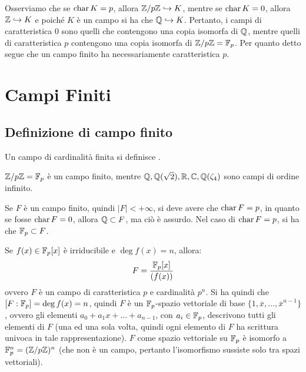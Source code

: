 \documentclass[11pt]{scrartcl}
\begin{document}
\begin{remark}
Osserviamo che se $\text{char}\, K = p $, allora ${\mathbb Z}/p{\mathbb Z} \hookrightarrow K$, mentre se $\text{char}\, K = 0$, allora $\mathbb Z \hookrightarrow K$ e poiché $K$ è un campo si ha che $\mathbb Q \hookrightarrow K$.
Pertanto, i campi di caratteristica $0$ sono quelli che contengono una copia isomorfa di $\mathbb Q$, mentre quelli di caratteristica $p$ contengono una copia isomorfa di ${\mathbb Z}/p{\mathbb Z} = {\mathbb F}_p$. Per quanto detto segue che un campo finito ha necessariamente caratteristica $p$.
\end{remark}

\newpage
\section{Campi Finiti}
\subsection{Definizione di campo finito}

\begin{definition}
Un campo di cardinalità finita si definisce .
\end{definition}

\begin{example}
${\mathbb Z}/p{\mathbb Z} = {\mathbb F}_p$ è un campo finito, mentre $\mathbb Q, \mathbb Q(\sqrt{2}), \mathbb R, \mathbb C, \mathbb Q(\zeta_4)$ sono campi di ordine
infinito.
\end{example}

\begin{remark}
	Se $F$ è un campo finito, quindi $|F|<+\infty$, si deve avere che $\text{char}\, F = p$,
	in quanto se fosse $\text{char}\, F = 0$, allora $\mathbb Q \subset F$, ma ciò è assurdo. Nel caso di $\text{char}\, F = p$,
	si ha che ${\mathbb F}_p \subset F$.
\end{remark}

\begin{remark}
	Se $f(x) \in {\mathbb F}_p[x]$ è irriducibile e $\deg f(x) = n$, allora:
		\[ F = \frac{{\mathbb F}_p[x]}{(f(x))}
			\]
	ovvero $F$ è un campo di caratteristica $p$ e cardinalità $p^n$.
	Si ha quindi che $[F:{\mathbb F}_p] = \deg f(x) = n$, quindi $F$ è un ${\mathbb F}_p$-spazio
	vettoriale di base $\{1, \overline x, \ldots, \overline x^{n-1}\}$, ovvero gli elementi
	$a_0 + a_1 x + \ldots + a_{n-1}$, con $a_i \in {\mathbb F}_p$, descrivono tutti gli
	elementi di $F$ (una ed una sola volta, quindi ogni elemento di $F$ ha scrittura univoca
	in tale rappresentazione). $F$ come spazio vettoriale su ${\mathbb F}_p$ è isomorfo a ${\mathbb F}_p^n = ({\mathbb Z}/p{\mathbb Z})^n$
	(che non è un campo, pertanto l'isomorfismo sussiste solo tra spazi vettoriali).
\end{remark}
\end{document}
